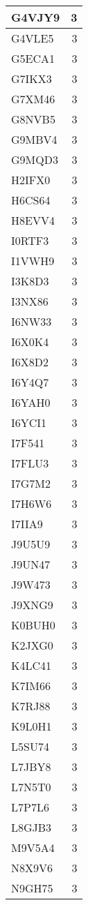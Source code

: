 \documentclass[
]{book}
\theoremstyle{definition}
\theoremstyle{definition}
\theoremstyle{definition}
\theoremstyle{definition}
\theoremstyle{remark}
\begin{document}
\begin{table}
\begin{tabular}{l|r}
\hline
G4VJY9 & 3\\
\hline
G4VLE5 & 3\\
\hline
G5ECA1 & 3\\
\hline
G7IKX3 & 3\\
\hline
G7XM46 & 3\\
\hline
G8NVB5 & 3\\
\hline
G9MBV4 & 3\\
\hline
G9MQD3 & 3\\
\hline
H2IFX0 & 3\\
\hline
H6CS64 & 3\\
\hline
H8EVV4 & 3\\
\hline
I0RTF3 & 3\\
\hline
I1VWH9 & 3\\
\hline
I3K8D3 & 3\\
\hline
I3NX86 & 3\\
\hline
I6NW33 & 3\\
\hline
I6X0K4 & 3\\
\hline
I6X8D2 & 3\\
\hline
I6Y4Q7 & 3\\
\hline
I6YAH0 & 3\\
\hline
I6YCI1 & 3\\
\hline
I7F541 & 3\\
\hline
I7FLU3 & 3\\
\hline
I7G7M2 & 3\\
\hline
I7H6W6 & 3\\
\hline
I7IIA9 & 3\\
\hline
J9U5U9 & 3\\
\hline
J9UN47 & 3\\
\hline
J9W473 & 3\\
\hline
J9XNG9 & 3\\
\hline
K0BUH0 & 3\\
\hline
K2JXG0 & 3\\
\hline
K4LC41 & 3\\
\hline
K7IM66 & 3\\
\hline
K7RJ88 & 3\\
\hline
K9L0H1 & 3\\
\hline
L5SU74 & 3\\
\hline
L7JBY8 & 3\\
\hline
L7N5T0 & 3\\
\hline
L7P7L6 & 3\\
\hline
L8GJB3 & 3\\
\hline
M9V5A4 & 3\\
\hline
N8X9V6 & 3\\
\hline
N9GH75 & 3\\

\end{tabular}
\end{table}
\end{document}
